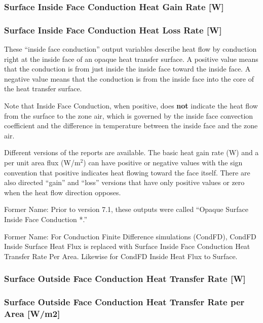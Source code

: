\subsubsection{Surface Inside Face Conduction Heat Gain Rate {[}W{]}}\label{surface-inside-face-conduction-heat-gain-rate-w}

\subsubsection{Surface Inside Face Conduction Heat Loss Rate {[}W{]}}\label{surface-inside-face-conduction-heat-loss-rate-w}

These ``inside face conduction'' output variables describe heat flow by conduction right at the inside face of an opaque heat transfer surface. A positive value means that the conduction is from just inside the inside face toward the inside face. A negative value means that the conduction is from the inside face into the core of the heat transfer surface.

Note that Inside Face Conduction, when positive, does \textbf{not} indicate the heat flow from the surface to the zone air, which is governed by the inside face convection coefficient and the difference in temperature between the inside face and the zone air.

Different versions of the reports are available. The basic heat gain rate (W) and a per unit area flux (W/m\(^{2}\)) can have positive or negative values with the sign convention that positive indicates heat flowing toward the face itself. There are also directed ``gain'' and ``loss'' versions that have only positive values or zero when the heat flow direction opposes.

Former Name: Prior to version 7.1, these outputs were called ``Opaque Surface Inside Face Conduction *.''

Former Name: For Conduction Finite Difference simulations (CondFD), CondFD Inside Surface Heat Flux is replaced with Surface Inside Face Conduction Heat Transfer Rate Per Area. Likewise for CondFD Inside Heat Flux to Surface.

\subsubsection{Surface Outside Face Conduction Heat Transfer Rate {[}W{]}}\label{surface-outside-face-conduction-heat-transfer-rate-w}

\subsubsection{Surface Outside Face Conduction Heat Transfer Rate per Area {[}W/m2{]}}\label{surface-outside-face-conduction-heat-transfer-rate-per-area-wm2}

